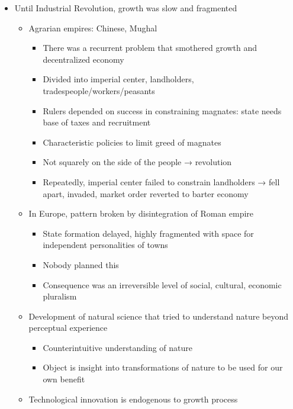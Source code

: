 \begin{itemize}
\tightlist
\item
  Until Industrial Revolution, growth was slow and fragmented

  \begin{itemize}
  \tightlist
  \item
    Agrarian empires: Chinese, Mughal

    \begin{itemize}
    \tightlist
    \item
      There was a recurrent problem that smothered growth and
      decentralized economy
    \item
      Divided into imperial center, landholders,
      tradespeople/workers/peasants
    \item
      Rulers depended on success in constraining magnates: state needs
      base of taxes and recruitment
    \item
      Characteristic policies to limit greed of magnates
    \item
      Not squarely on the side of the people → revolution
    \item
      Repeatedly, imperial center failed to constrain landholders → fell
      apart, invaded, market order reverted to barter economy
    \end{itemize}
  \item
    In Europe, pattern broken by disintegration of Roman empire

    \begin{itemize}
    \tightlist
    \item
      State formation delayed, highly fragmented with space for
      independent personalities of towns
    \item
      Nobody planned this
    \item
      Consequence was an irreversible level of social, cultural,
      economic pluralism
    \end{itemize}
  \item
    Development of natural science that tried to understand nature
    beyond perceptual experience

    \begin{itemize}
    \tightlist
    \item
      Counterintuitive understanding of nature
    \item
      Object is insight into transformations of nature to be used for
      our own benefit
    \end{itemize}
  \item
    Technological innovation is endogenous to growth process


\end{itemize}
\end{itemize}
